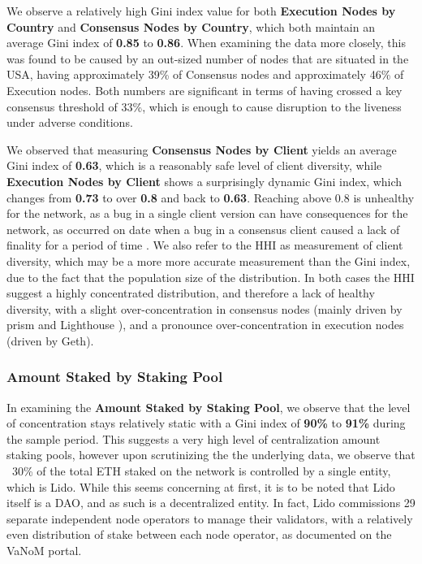 \documentclass[conference]{IEEEtran}
\begin{document}
We observe a relatively high Gini index value for both \textbf{Execution Nodes by Country} and \textbf{Consensus Nodes by Country}, which both maintain an average Gini index of \textbf{0.85} to \textbf{0.86}.  When examining the data more closely, this was found to be caused by an out-sized number of nodes that are situated in the USA, having approximately 39\% of Consensus nodes and approximately 46\% of Execution nodes.  Both numbers are significant in terms of having crossed a key consensus threshold of 33\%, which is enough to cause disruption to the liveness under adverse conditions.

We observed that measuring \textbf{Consensus Nodes by Client} yields an average Gini index of \textbf{0.63}, which is a reasonably safe level of client diversity, while \textbf{Execution Nodes by Client} shows a surprisingly dynamic Gini index, which changes from \textbf{0.73} to over \textbf{0.8} and back to \textbf{0.63}.  Reaching above 0.8 is unhealthy for the network, as a bug in a single client version can have consequences for the network, as occurred on date when a bug in a consensus client caused a lack of finality for a period of time \cite{offchainlabs2023}.  We also refer to the HHI as measurement of client diversity, which may be a more more accurate measurement than the Gini index, due to the fact that  the population size of the distribution.  In both cases the HHI suggest a highly concentrated distribution, and therefore a lack of healthy diversity, with a slight over-concentration in consensus nodes (mainly driven by prism and Lighthouse \cite{abu2023}), and a pronounce over-concentration in execution nodes (driven by Geth).

\subsubsection{Amount Staked by Staking Pool}
In examining the \textbf{Amount Staked by Staking Pool}, we observe that the level of concentration stays relatively static with a Gini index of \textbf{90\%} to \textbf{91\%} during the sample period.  This suggests a very high level of centralization amount staking pools, however upon scrutinizing the the underlying data, we observe that ~30\% of the total ETH staked on the network is controlled by a single entity, which is Lido.  While this seems concerning at first, it is to be noted that Lido itself is a DAO, and as such is a decentralized entity.  In fact, Lido commissions 29 separate independent node operators to manage their validators, with a relatively even distribution of stake between each node operator, as documented on the VaNoM portal\cite{lido2023}.
\end{document}
